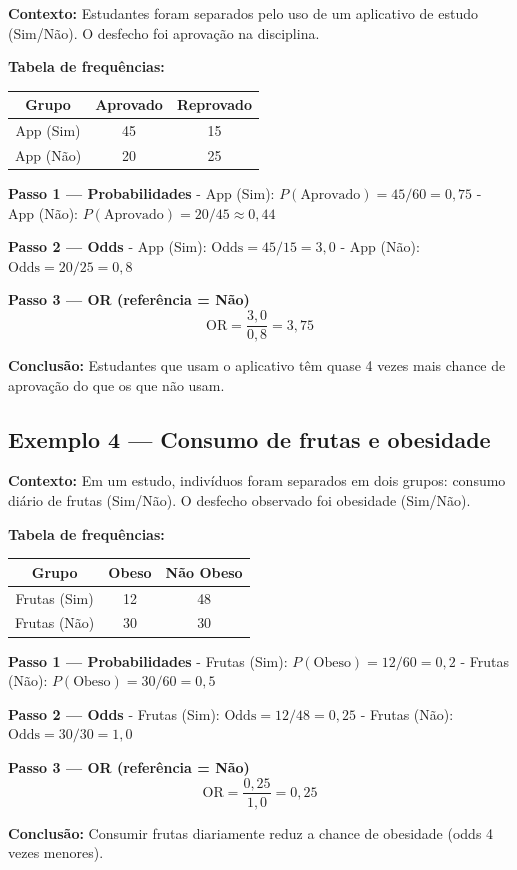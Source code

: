 \begin{SolvedBox}
\textbf{Contexto:} Estudantes foram separados pelo uso de um aplicativo de estudo (Sim/Não). O desfecho foi aprovação na disciplina.

\textbf{Tabela de frequências:}  

\begin{center}
\begin{tabular}{@{}c|c|c@{}}\toprule
Grupo & Aprovado & Reprovado \\\midrule
App (Sim)  & 45 & 15 \\
App (Não)  & 20 & 25 \\\bottomrule
\end{tabular}
\end{center}

\textbf{Passo 1 — Probabilidades}  
- App (Sim): $P(\text{Aprovado}) = 45/60 = 0,75$  
- App (Não): $P(\text{Aprovado}) = 20/45 \approx 0,44$

\textbf{Passo 2 — Odds}  
- App (Sim): $\mathrm{Odds} = 45/15 = 3,0$  
- App (Não): $\mathrm{Odds} = 20/25 = 0,8$

\textbf{Passo 3 — OR (referência = Não)}  
\[
\mathrm{OR} = \frac{3,0}{0,8} = 3,75
\]

\textbf{Conclusão:} Estudantes que usam o aplicativo têm quase 4 vezes mais chance de aprovação do que os que não usam.
\end{SolvedBox}


\subsection*{Exemplo 4 — Consumo de frutas e obesidade}

\begin{SolvedBox}
\textbf{Contexto:} Em um estudo, indivíduos foram separados em dois grupos: consumo diário de frutas (Sim/Não). O desfecho observado foi obesidade (Sim/Não).

\textbf{Tabela de frequências:}  

\begin{center}
\begin{tabular}{@{}c|c|c@{}}\toprule
Grupo & Obeso & Não Obeso \\\midrule
Frutas (Sim)  & 12 & 48 \\
Frutas (Não)  & 30 & 30 \\\bottomrule
\end{tabular}
\end{center}

\textbf{Passo 1 — Probabilidades}  
- Frutas (Sim): $P(\text{Obeso}) = 12/60 = 0,2$  
- Frutas (Não): $P(\text{Obeso}) = 30/60 = 0,5$

\textbf{Passo 2 — Odds}  
- Frutas (Sim): $\mathrm{Odds} = 12/48 = 0,25$  
- Frutas (Não): $\mathrm{Odds} = 30/30 = 1,0$

\textbf{Passo 3 — OR (referência = Não)}  
\[
\mathrm{OR} = \frac{0,25}{1,0} = 0,25
\]

\textbf{Conclusão:} Consumir frutas diariamente reduz a chance de obesidade (odds 4 vezes menores).
\end{SolvedBox}

